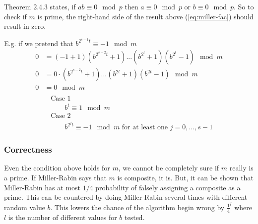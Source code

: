 Theorem $2.4.3$ states, if $ab \equiv 0 \mod p$ then $a \equiv 0
\mod p$ or $b \equiv 0 \mod p$. So to check if $m$ is prime, the
right-hand side of the result above (\ref{eq:miller-fac}) should
result in zero.

E.g. if we pretend that $b^{2^{s-1}t} \equiv -1 \mod m$
\begin{align*}
  0 &= (-1+1)(b^{2^{s-2}t}+1)...(b^{2^t}+1)(b^{2^t} - 1) \mod m \\
  0 &= 0 \cdot (b^{2^{s-2}t}+1)...(b^{2t}+1)(b^{2t} - 1) \mod m \\
  0 &= 0 \mod m \\
\end{align*}
\begin{align*}
  &\text{Case 1}\\
  &\qquad b^t \equiv 1 \mod m\\
  &\text{Case 2}\\
  &\qquad b^{2^{j}t} \equiv -1 \mod m \text{ for at least one $j=0,\ldots,s-1$}
\end{align*}

\subsubsection*{Correctness}
Even the condition above holds for $m$, we cannot be completely sure
if $m$ really is a prime. If Miller-Rabin says that $m$ is
composite, it is. But, it can be shown that Miller-Rabin has at most
$1/4$ probability of falsely assigning a composite as a prime. This
can be countered by doing Miller-Rabin several times with different
random value $b$. This lowers the chance of the algorithm begin
wrong by $\frac{1}{4}^l$ where $l$ is the number of different values
for $b$ tested.
